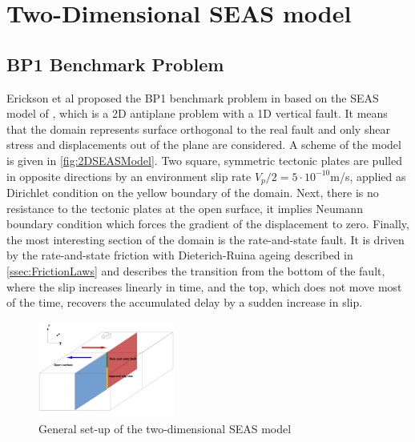 \chapter{Two-Dimensional SEAS model}
\label{chap:2DSEAS}

\section{BP1 Benchmark Problem}
Erickson et al proposed the BP1 benchmark problem in \cite{BP1-Benchmark} based on the SEAS model of \cite{GeneralSEASSimulations}, which is a 2D antiplane problem with a 1D vertical fault. It means that the domain represents surface orthogonal to the real fault and only shear stress and displacements out of the plane are considered. A scheme of the model is given in \autoref{fig:2DSEASModel}. Two square, symmetric tectonic plates are pulled in opposite directions by an environment slip rate $V_p/2=5\cdot10^{-10}$m/s, applied as Dirichlet condition on the yellow boundary of the domain. Next, there is no resistance to the tectonic plates at the open surface, it implies Neumann boundary condition which forces the gradient of the displacement to zero. Finally, the most interesting section of the domain is the rate-and-state fault. It is driven by the rate-and-state friction with Dieterich-Ruina ageing described in \autoref{ssec:FrictionLaws} and describes the transition from the bottom of the fault, where the slip increases linearly in time, and the top, which does not move most of the time, recovers the accumulated delay by a sudden increase in slip. \\

\begin{figure}[H]
	\centering
	\includegraphics[width=0.4\textwidth]{images/SEAS_2D_picture.pdf}
	\caption{General set-up of the two-dimensional SEAS model}
	\label{fig:2DSEASModel}
\end{figure}

